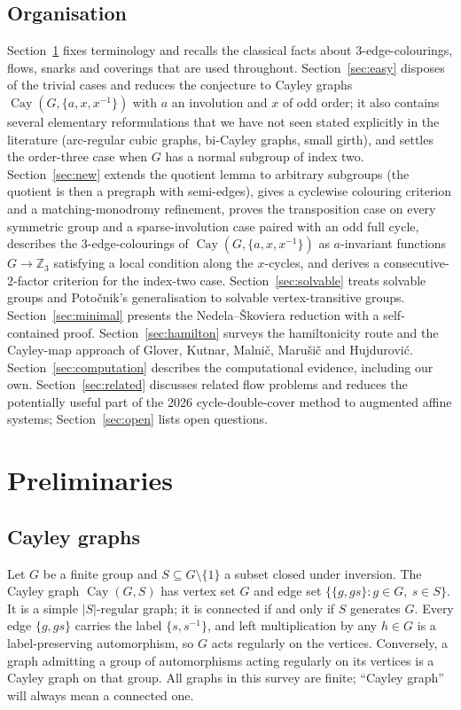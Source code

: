 \documentclass[11pt,a4paper]{article}
\theoremstyle{definition}
\theoremstyle{remark}
\newcommand{\Cay}{\operatorname{Cay}}
\begin{document}
\subsection*{Organisation}
Section~\ref{sec:prelim} fixes terminology and recalls the classical facts about $3$-edge-colourings, flows, snarks and coverings that are used throughout.  Section~\ref{sec:easy} disposes of the trivial cases and reduces the conjecture to Cayley graphs $\Cay(G,\{a,x,x^{-1}\})$ with $a$ an involution and $x$ of odd order; it also contains several elementary reformulations that we have not seen stated explicitly in the literature (arc-regular cubic graphs, bi-Cayley graphs, small girth), and settles the order-three case when $G$ has a normal subgroup of index two.  Section~\ref{sec:new} extends the quotient lemma to arbitrary subgroups (the quotient is then a pregraph with semi-edges), gives a cyclewise colouring criterion and a matching-monodromy refinement, proves the transposition case on every symmetric group and a sparse-involution case paired with an odd full cycle, describes the $3$-edge-colourings of $\Cay(G,\{a,x,x^{-1}\})$ as $a$-invariant functions $G\to\mathbb{Z}_3$ satisfying a local condition along the $x$-cycles, and derives a consecutive-$2$-factor criterion for the index-two case.  Section~\ref{sec:solvable} treats solvable groups and Poto\v{c}nik's generalisation to solvable vertex-transitive groups.  Section~\ref{sec:minimal} presents the Nedela--\v{S}koviera reduction with a self-contained proof.  Section~\ref{sec:hamilton} surveys the hamiltonicity route and the Cayley-map approach of Glover, Kutnar, Malni\v{c}, Maru\v{s}i\v{c} and Hujdurovi\'c.  Section~\ref{sec:computation} describes the computational evidence, including our own.  Section~\ref{sec:related} discusses related flow problems and reduces the potentially useful part of the 2026 cycle-double-cover method to augmented affine systems; Section~\ref{sec:open} lists open questions.

\section{Preliminaries}\label{sec:prelim}

\subsection{Cayley graphs}
Let $G$ be a finite group and $S\subseteq G\setminus\{1\}$ a subset closed under inversion.  The Cayley graph $\Cay(G,S)$ has vertex set $G$ and edge set $\{\{g,gs\}: g\in G,\ s\in S\}$.  It is a simple $|S|$-regular graph; it is connected if and only if $S$ generates $G$.  Every edge $\{g,gs\}$ carries the label $\{s,s^{-1}\}$, and left multiplication by any $h\in G$ is a label-preserving automorphism, so $G$ acts regularly on the vertices.  Conversely, a graph admitting a group of automorphisms acting regularly on its vertices is a Cayley graph on that group.  All graphs in this survey are finite; ``Cayley graph'' will always mean a connected one.
\end{document}
